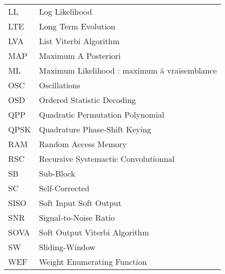 \begin{center}
\begin{longtable}{ p{}  p{} }
LL 	 		&  	Log Likelihood	 																					\\
LTE			& 	Long Term Evolution 																				\\
LVA			&	List Viterbi Algorithm	 																			\\
MAP			&   Maximum A Posteriori 																				\\
ML			&   Maximum Likelihood : maximum à vraisemblance 														\\
OSC			& 	Oscillations																						\\
OSD			& 	Ordered Statistic Decoding 																			\\
QPP			& 	Quadratic Permutation Polynomial	 																\\
QPSK		&	Quadrature Phase-Shift Keying																		\\
RAM			& 	Random Access Memory																				\\
RSC			& 	Recursive Systemactic Convolutionnal																\\
SB			&	Sub-Block																							\\
SC			&   Self-Corrected																						\\
SISO		&   Soft Input Soft Output																				\\
SNR			&	Signal-to-Noise Ratio																				\\
SOVA		&	Soft Output Viterbi Algorithm																		\\
SW			&	Sliding-Window																						\\
WEF			&   Weight Enumerating Function 																		\\
\end{longtable}
\end{center}

